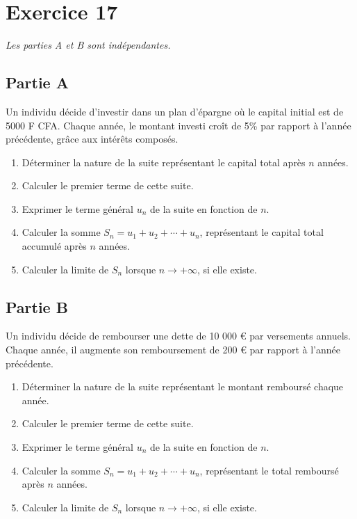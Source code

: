 \documentclass[a4paper,11pt]{article}
\begin{document}
\section*{Exercice 17}

\textit{Les parties A et B sont indépendantes.}

\subsection*{Partie A}

Un individu décide d’investir dans un plan d’épargne où le capital initial est de 5000 F CFA. Chaque année, le montant investi croît de 5\% par rapport à l’année précédente, grâce aux intérêts composés.

\begin{enumerate}
    \item Déterminer la nature de la suite représentant le capital total après \(n\) années.
    \item Calculer le premier terme de cette suite.
    \item Exprimer le terme général \(u_n\) de la suite en fonction de \(n\).
    \item Calculer la somme \(S_n = u_1 + u_2 + \cdots + u_n\), représentant le capital total accumulé après \(n\) années.
    \item Calculer la limite de \(S_n\) lorsque \(n \to +\infty\), si elle existe.
\end{enumerate}

\subsection*{Partie B}

Un individu décide de rembourser une dette de 10 000 € par versements annuels. Chaque année, il augmente son remboursement de 200 € par rapport à l’année précédente.

\begin{enumerate}
    \item Déterminer la nature de la suite représentant le montant remboursé chaque année.
    \item Calculer le premier terme de cette suite.
    \item Exprimer le terme général \(u_n\) de la suite en fonction de \(n\).
    \item Calculer la somme \(S_n = u_1 + u_2 + \cdots + u_n\), représentant le total remboursé après \(n\) années.
    \item Calculer la limite de \(S_n\) lorsque \(n \to +\infty\), si elle existe.
\end{enumerate}
\end{document}
